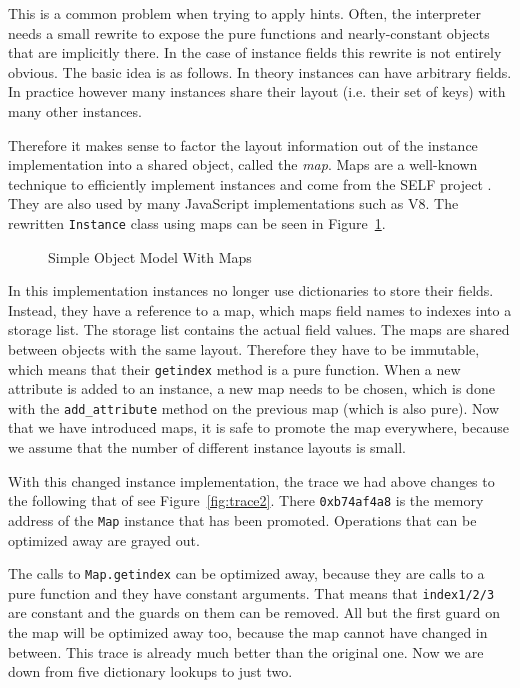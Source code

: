 \documentclass{sigplanconf}
\let\oldcite=\cite
\renewcommand\cite[1]{\ifthenelse{\equal{#1}{XXX}}{[citation~needed]}{\oldcite{#1}}}
\begin{document}
This is a common problem when trying to apply hints. Often, the interpreter
needs a small rewrite to expose the pure functions and nearly-constant objects
that are implicitly there. In the case of instance fields this rewrite is not
entirely obvious. The basic idea is as follows. In theory instances can have
arbitrary fields. In practice however many instances share their layout (i.e.
their set of keys) with many other instances.

Therefore it makes sense to factor the layout information out of the instance
implementation into a shared object, called the \emph{map}. Maps are a well-known
technique to efficiently implement instances and come from the SELF project
\cite{XXX}. They are also used by many JavaScript implementations such as V8.
The rewritten \texttt{Instance} class using maps can be seen in
Figure~\ref{fig:maps}.

\begin{figure}

\caption{Simple Object Model With Maps}
\label{fig:maps}
\end{figure}

In this implementation instances no longer use dictionaries to store their fields. Instead, they have a
reference to a map, which maps field names to indexes into a storage list. The
storage list contains the actual field values. The maps are shared between
objects with the same layout. Therefore they have to be immutable, which means
that their \texttt{getindex} method is a pure function. When a new attribute is added
to an instance, a new map needs to be chosen, which is done with the
\texttt{add\_attribute} method on the previous map (which is also pure). Now that we have
introduced maps, it is safe to promote the map everywhere, because we assume
that the number of different instance layouts is small.

With this changed instance implementation, the trace we had above changes to the
following that of see Figure~\ref{fig:trace2}. There \texttt{0xb74af4a8} is the
memory address of the \texttt{Map} instance that has been promoted. Operations
that can be optimized away are grayed out.

The calls to \texttt{Map.getindex} can be optimized away, because they are calls to
a pure function and they have constant arguments. That means that \texttt{index1/2/3}
are constant and the guards on them can be removed. All but the first guard on
the map will be optimized away too, because the map cannot have changed in
between. This trace is already much better than
the original one. Now we are down from five dictionary lookups to just two.
\end{document}
